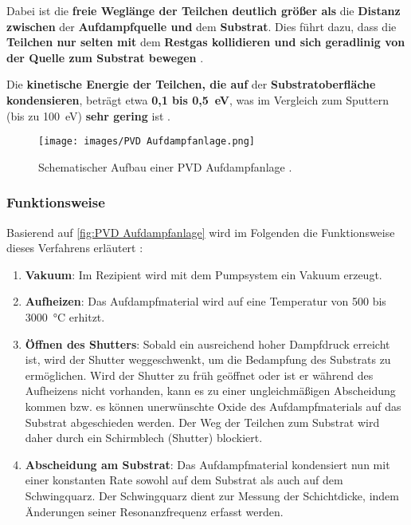 \documentclass{article} %
\begin{document}
Dabei ist die \textbf{freie Weglänge der Teilchen deutlich größer als} die \textbf{Distanz zwischen} der \textbf{Aufdampfquelle und} dem 
\textbf{Substrat}. Dies führt dazu, dass die \textbf{Teilchen nur selten mit} dem \textbf{Restgas kollidieren und sich geradlinig von der Quelle 
zum Substrat bewegen} \cite{keplinger2024}.

\vspace{1em}

Die \textbf{kinetische Energie der Teilchen, die auf} der \textbf{Substratoberfläche kondensieren}, beträgt etwa \textbf{0,1 bis 0,5~eV}, was im 
Vergleich zum Sputtern (bis zu 100~eV) \textbf{sehr gering} ist \cite{keplinger2024}.

\begin{figure}[htb!]
    \centering
    \texttt{[image: images/PVD Aufdampfanlage.png]} %
    \captionsetup{labelfont=bf} %
    \caption{Schematischer Aufbau einer PVD Aufdampfanlage \cite{keplinger2024}.}
    \label{fig:PVD Aufdampfanlage}
\end{figure}

\vspace{1em}
\subsubsection{Funktionsweise}
Basierend auf \autoref{fig:PVD Aufdampfanlage} wird im Folgenden die Funktionsweise dieses Verfahrens erläutert \cite{keplinger2024}:

\begin{enumerate}
    \item \textbf{Vakuum}: Im Rezipient wird mit dem Pumpsystem ein Vakuum erzeugt.
    \item \textbf{Aufheizen}: Das Aufdampfmaterial wird auf eine Temperatur von 500 bis 3000~°C erhitzt.
    \item \textbf{Öffnen des Shutters}: Sobald ein ausreichend hoher Dampfdruck erreicht ist, wird der Shutter weggeschwenkt, um die Bedampfung 
    des Substrats zu ermöglichen. Wird der Shutter zu früh geöffnet oder ist er während des Aufheizens nicht vorhanden, kann es zu einer 
    ungleichmäßigen Abscheidung kommen bzw. es können unerwünschte Oxide des Aufdampfmaterials auf das Substrat abgeschieden werden. Der Weg der
     Teilchen zum Substrat wird daher durch ein Schirmblech (Shutter) blockiert.
    \item \textbf{Abscheidung am Substrat}: Das Aufdampfmaterial kondensiert nun mit einer konstanten Rate sowohl auf dem Substrat als auch auf 
    dem Schwingquarz. Der Schwingquarz dient zur Messung der Schichtdicke, indem Änderungen seiner Resonanzfrequenz erfasst werden.
\end{enumerate}
\end{document}
